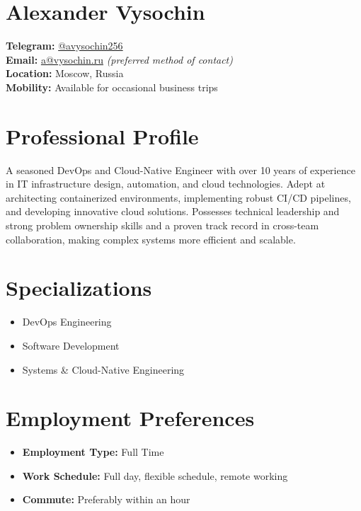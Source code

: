 \documentclass[12pt,a4paper]{article}
\begin{document}
\section*{Alexander Vysochin}

\textbf{Telegram:} \href{https://t.me/avysochin256}{@avysochin256}\\
\textbf{Email:} \href{mailto:a@vysochin.ru}{a@vysochin.ru} \emph{(preferred method of contact)}\\
\textbf{Location:} Moscow, Russia\\
\textbf{Mobility:} Available for occasional business trips

\section*{Professional Profile}
A seasoned DevOps and Cloud-Native Engineer with over 10 years of experience in IT infrastructure design, automation, and cloud technologies. Adept at architecting containerized environments, implementing robust CI/CD pipelines, and developing innovative cloud solutions. Possesses technical leadership and strong problem ownership skills and a proven track record in cross-team collaboration, making complex systems more efficient and scalable.

\section*{Specializations}
\begin{itemize}
    \item DevOps Engineering
    \item Software Development
    \item Systems \& Cloud-Native Engineering
\end{itemize}

\section*{Employment Preferences}
\begin{itemize}
    \item \textbf{Employment Type:} Full Time
    \item \textbf{Work Schedule:} Full day, flexible schedule, remote working
    \item \textbf{Commute:} Preferably within an hour
\end{itemize}
\end{document}
